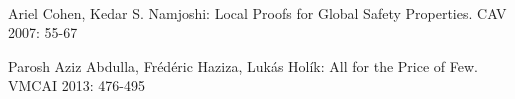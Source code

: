\begin{enumerate}
~

Ariel Cohen, Kedar S. Namjoshi:
Local Proofs for Global Safety Properties. CAV 2007: 55-67
~

Parosh Aziz Abdulla, Frédéric Haziza, Lukás Holík:
All for the Price of Few. VMCAI 2013: 476-495


\end{enumerate}
